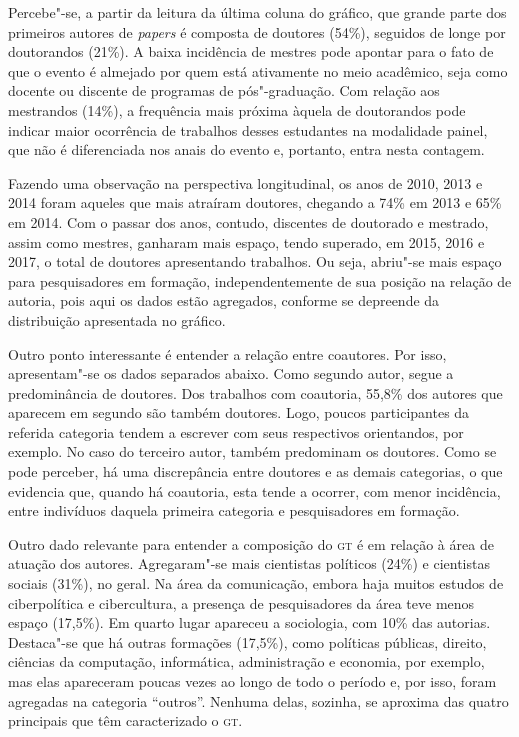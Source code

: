 {

Percebe"-se, a partir da leitura da última coluna do gráfico, que grande
parte dos primeiros autores de \textit{papers} é composta de
doutores (54\%), seguidos de longe por doutorandos (21\%). A
baixa incidência de mestres pode apontar para o fato de que o evento
é almejado por quem está ativamente no meio acadêmico, seja como docente
ou discente de programas de pós"-graduação. Com relação aos
mestrandos (14\%), a frequência mais próxima àquela de doutorandos
pode indicar maior ocorrência de trabalhos desses estudantes na
modalidade painel, que não é diferenciada nos anais do evento e,
portanto, entra nesta contagem.

Fazendo uma observação na perspectiva longitudinal, os anos de 2010,
2013 e 2014 foram aqueles que mais atraíram doutores, chegando a 74\%
em 2013 e 65\% em 2014. Com o passar dos anos, contudo, discentes de
doutorado e mestrado, assim como mestres, ganharam mais espaço, tendo
superado, em 2015, 2016 e 2017, o total de doutores apresentando
trabalhos. Ou seja, abriu"-se mais espaço para pesquisadores em
formação, independentemente de sua posição na relação de autoria, pois
aqui os dados estão agregados, conforme se depreende da distribuição
apresentada no gráfico.

Outro ponto interessante é entender a relação entre coautores. Por
isso, apresentam"-se os dados separados abaixo. Como segundo autor,
segue a predominância de doutores. Dos trabalhos com coautoria,
55,8\% dos autores que aparecem em segundo são também doutores.
Logo, poucos participantes da referida categoria tendem a escrever com
seus respectivos orientandos, por exemplo. No caso do
terceiro autor, também predominam os doutores. Como se pode
perceber, há uma discrepância entre doutores e as demais categorias,
o que evidencia que, quando há coautoria, esta tende a ocorrer, com
menor incidência, entre indivíduos daquela primeira categoria e
pesquisadores em formação.

Outro dado relevante para entender a composição do \textsc{gt} é em relação à
área de atuação dos autores. Agregaram"-se mais cientistas
políticos (24\%) e cientistas sociais (31\%), no geral. Na área da
comunicação, embora haja muitos estudos de ciberpolítica e cibercultura,
a presença de pesquisadores da área teve menos espaço (17,5\%). Em
quarto lugar apareceu a sociologia, com 10\% das autorias. Destaca"-se
que há outras formações (17,5\%), como políticas públicas, direito,
ciências da computação, informática, administração e economia, por
exemplo, mas elas apareceram poucas vezes ao longo de todo o período e,
por isso, foram agregadas na categoria ``outros''. Nenhuma delas,
sozinha, se aproxima das quatro principais que têm caracterizado o \textsc{gt}.


}
